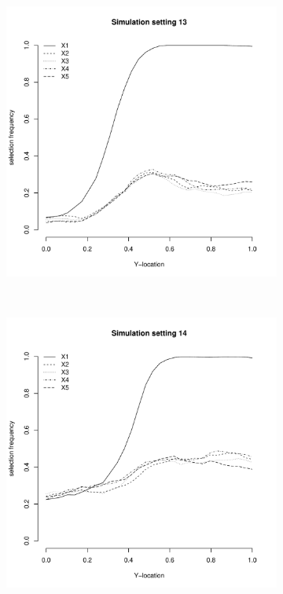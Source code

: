 \documentclass[authoryear, review, 11pt]{elsarticle}
\begin{document}
	
	\begin{figure}
		\centering
		\begin{subfigure}[b]{0.3\textwidth}
			\centering
			\includegraphics[width=\textwidth]{../../figures/simulation/28-13-profile-selection.pdf}
			\label{fig:gull}
		\end{subfigure}%
        ~ %
		\begin{subfigure}[b]{0.3\textwidth}
			\centering
			\includegraphics[width=\textwidth]{../../figures/simulation/28-14-profile-selection.pdf}

\end{subfigure}
\end{figure}
\end{document}
